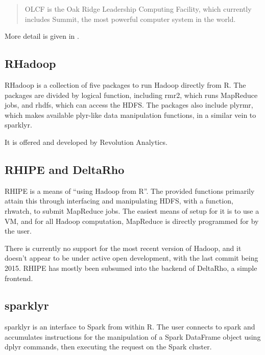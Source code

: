 \begin{quote}
    OLCF is the Oak Ridge Leadership Computing Facility, which currently
    includes Summit, the most powerful computer system in the world.
\end{quote}

More detail is given in \cite{pbdBASEvignette}.

\hypertarget{sec:rhadoop}{%
    \subsection{RHadoop}\label{sec:rhadoop}}

RHadoop is a collection of five packages to run Hadoop directly from
R\cite{analytics:_rhadoop_wiki}. The packages are divided by logical
function, including rmr2, which runs MapReduce jobs, and rhdfs, which
can access the HDFS. The packages also include plyrmr, which makes
available plyr-like data manipulation functions, in a similar vein to
sparklyr.

It is offered and developed by Revolution Analytics.

\hypertarget{sec:rhipe-deltarho}{%
    \subsection{RHIPE and DeltaRho}\label{sec:rhipe-deltarho}}

RHIPE is a means of ``using Hadoop from R''\cite{deltarho:_rhipe}. The
provided functions primarily attain this through interfacing and
manipulating HDFS, with a function, rhwatch, to submit MapReduce jobs.
The easiest means of setup for it is to use a VM, and for all Hadoop
computation, MapReduce is directly programmed for by the user.

There is currently no support for the most recent version of Hadoop, and
it doesn't appear to be under active open development, with the last
commit being 2015. RHIPE has mostly been subsumed into the backend of
DeltaRho, a simple frontend.

\hypertarget{sparklyr}{%
    \subsection{sparklyr}\label{sparklyr}}

sparklyr is an interface to Spark from within R\cite{luraschi20}. The
user connects to spark and accumulates instructions for the manipulation
of a Spark DataFrame object using dplyr commands, then executing the
request on the Spark cluster.

